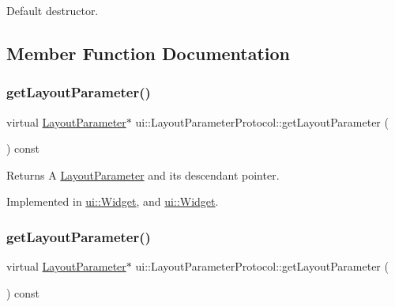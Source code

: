 Default destructor. 

\subsection{Member Function Documentation}
\mbox{\label{classui_1_1LayoutParameterProtocol_a188012c584b8f9ccca95b1dffea6fb0b}} 
\subsubsection{\texorpdfstring{get\+Layout\+Parameter()}{getLayoutParameter()}\hspace{0.1cm}{\footnotesize\ttfamily [1/2]}}
{\footnotesize\ttfamily virtual \hyperlink{classui_1_1LayoutParameter}{Layout\+Parameter}$\ast$ ui\+::\+Layout\+Parameter\+Protocol\+::get\+Layout\+Parameter (\begin{DoxyParamCaption}{ }\end{DoxyParamCaption}) const\hspace{0.3cm}{\ttfamily [pure virtual]}}

\begin{DoxyReturn}{Returns}
A \hyperlink{classui_1_1LayoutParameter}{Layout\+Parameter} and its descendant pointer. 
\end{DoxyReturn}


Implemented in \hyperlink{classui_1_1Widget_a4d8d234130e8bd8214fa924369b8060f}{ui\+::\+Widget}, and \hyperlink{classui_1_1Widget_a25425cde194b4f37f56f938bb69a9a96}{ui\+::\+Widget}.

\mbox{\label{classui_1_1LayoutParameterProtocol_a188012c584b8f9ccca95b1dffea6fb0b}} 
\subsubsection{\texorpdfstring{get\+Layout\+Parameter()}{getLayoutParameter()}\hspace{0.1cm}{\footnotesize\ttfamily [2/2]}}
{\footnotesize\ttfamily virtual \hyperlink{classui_1_1LayoutParameter}{Layout\+Parameter}$\ast$ ui\+::\+Layout\+Parameter\+Protocol\+::get\+Layout\+Parameter (\begin{DoxyParamCaption}{ }\end{DoxyParamCaption}) const\hspace{0.3cm}{\ttfamily [pure virtual]}}

